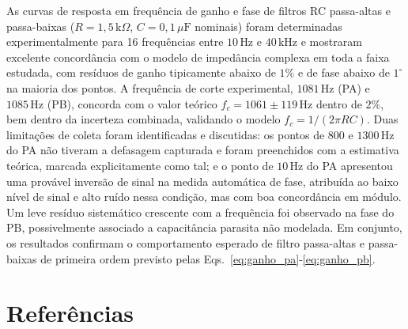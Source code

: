\documentclass[reprint,amsmath,amssymb,aps,prl,floatfix,onecolumn]{revtex4-2}
\begin{document}
As curvas de resposta em frequência de ganho e fase de filtros RC passa-altas e passa-baixas ($R=1{,}5\,\text{k}\Omega$, $C=0{,}1\,\mu\text{F}$ nominais) foram determinadas experimentalmente para 16 frequências entre $10\,\text{Hz}$ e $40\,\text{kHz}$ e mostraram excelente concordância com o modelo de impedância complexa em toda a faixa estudada, com resíduos de ganho tipicamente abaixo de $1\%$ e de fase abaixo de $1^\circ$ na maioria dos pontos. A frequência de corte experimental, $1081\,\text{Hz}$ (PA) e $1085\,\text{Hz}$ (PB), concorda com o valor teórico $f_c=1061\pm119\,\text{Hz}$ dentro de $2\%$, bem dentro da incerteza combinada, validando o modelo $f_c=1/(2\pi RC)$. Duas limitações de coleta foram identificadas e discutidas: os pontos de $800$ e $1300\,\text{Hz}$ do PA não tiveram a defasagem capturada e foram preenchidos com a estimativa teórica, marcada explicitamente como tal; e o ponto de $10\,\text{Hz}$ do PA apresentou uma provável inversão de sinal na medida automática de fase, atribuída ao baixo nível de sinal e alto ruído nessa condição, mas com boa concordância em módulo. Um leve resíduo sistemático crescente com a frequência foi observado na fase do PB, possivelmente associado a capacitância parasita não modelada. Em conjunto, os resultados confirmam o comportamento esperado de filtro passa-altas e passa-baixas de primeira ordem previsto pelas Eqs.~\eqref{eq:ganho_pa}-\eqref{eq:ganho_pb}.

\section*{Referências}



\end{document}
